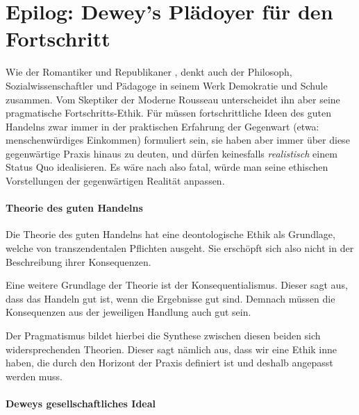 \section[Dewey]{Epilog: Dewey's Plädoyer für den Fortschritt}

Wie der Romantiker und Republikaner \citeauthor{rousseau-1762}, denkt auch der Philosoph, Sozialwissenschaftler und Pädagoge \citeauthor{Dewey2010} in seinem Werk Demokratie und Schule zusammen.
Vom Skeptiker der Moderne Rousseau unterscheidet ihn aber seine pragmatische Fortschritts-Ethik.
Für \citeauthor{Dewey2010} müssen fortschrittliche Ideen des guten Handelns zwar immer in der  praktischen Erfahrung der Gegenwart (etwa: menschenwürdiges Einkommen) formuliert sein, sie haben aber immer über diese gegenwärtige Praxis hinaus zu deuten, und dürfen keinesfalls \emph{realistisch} einem Status Quo idealisieren.
Es wäre nach \citeauthor{Dewey2010} also fatal, würde man seine ethischen Vorstellungen der gegenwärtigen Realität anpassen.


\paragraph{Theorie des guten Handelns}

Die Theorie des guten Handelns hat eine deontologische Ethik als Grundlage, welche von transzendentalen Pflichten ausgeht.
Sie erschöpft sich also nicht in der Beschreibung ihrer Konsequenzen.

Eine weitere Grundlage der Theorie ist der Konsequentialismus.
Dieser sagt aus, dass das Handeln gut ist, wenn die Ergebnisse gut sind.
Demnach müssen die Konsequenzen aus der jeweiligen Handlung auch gut sein.

Der Pragmatismus bildet hierbei die Synthese zwischen diesen beiden sich widersprechenden Theorien.
Dieser sagt nämlich aus, dass wir eine Ethik inne haben, die durch den Horizont der Praxis definiert ist und deshalb angepasst werden muss.


\paragraph{Deweys gesellschaftliches Ideal}

